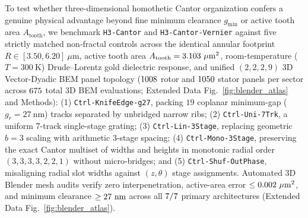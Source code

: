 \documentclass[pdflatex,sn-nature]{sn-jnl}
\DeclareRobustCommand{\roundthree}[1]{\fpeval{round(#1,3)}}
\begin{document}
To test whether three-dimensional homothetic Cantor organization confers a genuine physical advantage beyond fine minimum clearance $g_{\min}$ or active tooth area $A_{\mathrm{tooth}}$, we benchmark \texttt{H3-Cantor} and \texttt{H3-Cantor-Vernier} against five strictly matched non-fractal controls across the identical annular footprint $R \in [3.50, 6.20]\ \mu\mathrm{m}$, active tooth area $A_{\mathrm{tooth}} = 3.103{}\ \mu\mathrm{m}^2$, room-temperature ($T=300\ \mathrm{K}$) Drude--Lorentz gold dielectric response\cite{rakic1998}, and unified $(2,2,2,9)$ 3D Vector-Dyadic BEM panel topology ($1008{}$ rotor and $1050{}$ stator panels per sector across $675{}$ total 3D BEM evaluations; Extended Data Fig.~\ref{fig:blender_atlas} and Methods): (1) \texttt{Ctrl-KnifeEdge-g27}, packing $19$ coplanar minimum-gap ($g_r = 27\ \mathrm{nm}$) tracks separated by unbridged narrow ribs; (2) \texttt{Ctrl-Uni-7Trk}, a uniform 7-track single-stage grating; (3) \texttt{Ctrl-Lin-3Stage}, replacing geometric $b=3$ scaling with arithmetic 3-stage spacing; (4) \texttt{Ctrl-Mono-3Stage}, preserving the exact Cantor multiset of widths and heights in monotonic radial order $(3,3,3,3,2,2,1)$ without micro-bridges; and (5) \texttt{Ctrl-Shuf-OutPhase}, misaligning radial slot widths against $(z,\theta)$ stage assignments. Automated 3D Blender mesh audits verify zero interpenetration, active-area error $\le \roundthree{\HthreeBlenderMaxAreaErrUmtwo}\ \mu\mathrm{m}^2$, and minimum clearance $\ge \HthreeBlenderMinClearanceNm{}\ \mathrm{nm}$ across all $7{}/7{}$ primary architectures (Extended Data Fig.~\ref{fig:blender_atlas}).
\end{document}

